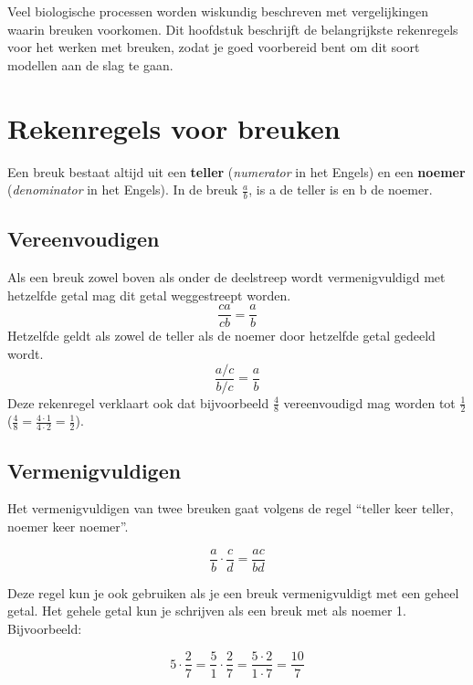 \documentclass[
  a4paper,
]{scrbook}
\theoremstyle{definition}
\theoremstyle{remark}
\begin{document}
Veel biologische processen worden wiskundig beschreven met
vergelijkingen waarin breuken voorkomen. Dit hoofdstuk beschrijft de
belangrijkste rekenregels voor het werken met breuken, zodat je goed
voorbereid bent om dit soort modellen aan de slag te gaan.

\hypertarget{rekenregels-voor-breuken}{%
\section{Rekenregels voor breuken}\label{rekenregels-voor-breuken}}

Een breuk bestaat altijd uit een \textbf{teller} (\emph{numerator} in
het Engels) en een \textbf{noemer} (\emph{denominator} in het Engels).
In de breuk \(\frac{a}{b}\), is a de teller is en b de noemer.

\hypertarget{vereenvoudigen}{%
\subsection*{Vereenvoudigen}\label{vereenvoudigen}}

Als een breuk zowel boven als onder de deelstreep wordt vermenigvuldigd
met hetzelfde getal mag dit getal weggestreept worden. \[
\frac{ca}{cb} = \frac{a}{b}
\] Hetzelfde geldt als zowel de teller als de noemer door hetzelfde
getal gedeeld wordt. \[
\frac{a/c}{b/c} = \frac{a}{b}
\] Deze rekenregel verklaart ook dat bijvoorbeeld \(\frac{4}{8}\)
vereenvoudigd mag worden tot \(\frac{1}{2}\)
(\(\frac{4}{8} = \frac{4\cdot1}{4\cdot2} = \frac{1}{2}\)).

\hypertarget{vermenigvuldigen}{%
\subsection*{Vermenigvuldigen}\label{vermenigvuldigen}}

Het vermenigvuldigen van twee breuken gaat volgens de regel ``teller
keer teller, noemer keer noemer''.

\[
\frac{a}{b}\cdot\frac{c}{d}=\frac{ac}{bd}
\]

\begin{tcolorbox}[enhanced jigsaw, coltitle=black, breakable, bottomtitle=1mm, opacityback=0, colback=white, rightrule=.15mm, title=\textcolor{quarto-callout-tip-color}{\faLightbulb}\hspace{0.5em}{Tip}, bottomrule=.15mm, toprule=.15mm, left=2mm, colframe=quarto-callout-tip-color-frame, toptitle=1mm, opacitybacktitle=0.6, titlerule=0mm, colbacktitle=quarto-callout-tip-color!10!white, leftrule=.75mm, arc=.35mm]

Deze regel kun je ook gebruiken als je een breuk vermenigvuldigt met een
geheel getal. Het gehele getal kun je schrijven als een breuk met als
noemer 1. Bijvoorbeeld:

\[
5\cdot\frac{2}{7} = \frac{5}{1}\cdot\frac{2}{7} = \frac{5\cdot2}{1\cdot7} = \frac{10}{7}
\]

\end{tcolorbox}
\end{document}
